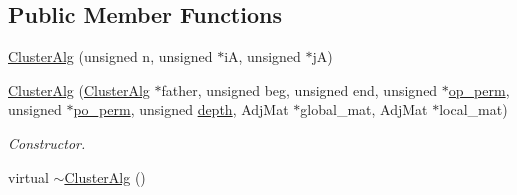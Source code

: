 \subsection*{\-Public \-Member \-Functions}
\begin{DoxyCompactItemize}
\item 
\hyperlink{classClusterAlg_a5637ecc2686cb0d43965470218e84863}{\-Cluster\-Alg} (unsigned n, unsigned $\ast$i\-A, unsigned $\ast$j\-A)
\item 
\hyperlink{classClusterAlg_a7cf98bcd418f6afdc30b7c7457722851}{\-Cluster\-Alg} (\hyperlink{classClusterAlg}{\-Cluster\-Alg} $\ast$father, unsigned beg, unsigned end, unsigned $\ast$\hyperlink{classClusterAlg_a4f06e1465978072d8c6bd098e062b701}{op\-\_\-perm}, unsigned $\ast$\hyperlink{classClusterAlg_af3d1d7c4ae0516ff9de725d3ff760b07}{po\-\_\-perm}, unsigned \hyperlink{classClusterAlg_ac06ccb0ba85be10e97392bd063fa78c8}{depth}, \-Adj\-Mat $\ast$global\-\_\-mat, \-Adj\-Mat $\ast$local\-\_\-mat)
\begin{DoxyCompactList}\small\item\em \-Constructor. \end{DoxyCompactList}\item 
\hypertarget{classClusterAlg_aa6496a6fbd35f3f230b9550778cb49c1}{
virtual \hyperlink{classClusterAlg_aa6496a6fbd35f3f230b9550778cb49c1}{$\sim$\-Cluster\-Alg} ()}
\label{classClusterAlg_aa6496a6fbd35f3f230b9550778cb49c1}


\end{DoxyCompactItemize}
